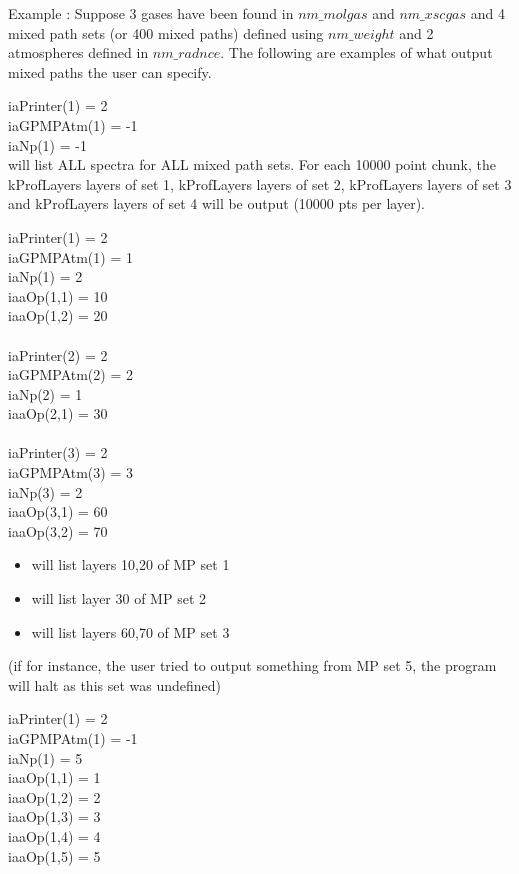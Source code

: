 \documentclass[12pt]{article}
\newcommand{\ttab}{\indent\indent}
\begin{document}
{{Example : Suppose 3 gases have been found in $nm\_molgas$ and $nm\_xscgas$ 
and 4 mixed path sets (or 400 mixed paths) defined using $nm\_weight$ and 2 
atmospheres defined in $nm\_radnce$.  The following are examples of what 
output mixed paths the user can specify.

\medskip
\medskip
\ttab iaPrinter(1) = 2\\
\ttab iaGPMPAtm(1) = -1\\
\ttab iaNp(1)      = -1\\

\medskip
\noindent
will list ALL spectra for ALL mixed path sets.  For each 10000 point chunk,
the kProfLayers layers of set 1, kProfLayers layers of set 2, kProfLayers 
layers of set 3 and kProfLayers layers of set 4 will be output 
(10000 pts per layer).

\medskip
\medskip
\ttab iaPrinter(1) = 2\\
\ttab iaGPMPAtm(1) = 1\\
\ttab iaNp(1)      = 2\\
\ttab iaaOp(1,1)   = 10\\
\ttab iaaOp(1,2)   = 20\\
\ttab \\
\ttab iaPrinter(2) = 2\\
\ttab iaGPMPAtm(2) = 2\\
\ttab iaNp(2)      = 1\\
\ttab iaaOp(2,1)   = 30\\
\ttab \\
\ttab iaPrinter(3) = 2\\
\ttab iaGPMPAtm(3) = 3\\
\ttab iaNp(3)      = 2\\
\ttab iaaOp(3,1)   = 60\\
\ttab iaaOp(3,2)   = 70\\

\begin{itemize}
\item will list layers 10,20  of MP set 1
\item will list layer  30     of MP set 2
\item will list layers 60,70  of MP set 3
\end{itemize}
(if for instance, the user tried to output something from MP set 5, the 
program will halt as this set was undefined)

\medskip
\medskip
\ttab iaPrinter(1) = 2\\
\ttab iaGPMPAtm(1) = -1\\
\ttab iaNp(1)      = 5\\
\ttab iaaOp(1,1)   = 1\\
\ttab iaaOp(1,2)   = 2\\
\ttab iaaOp(1,3)   = 3\\
\ttab iaaOp(1,4)   = 4\\
\ttab iaaOp(1,5)   = 5\\

}}
\end{document}
